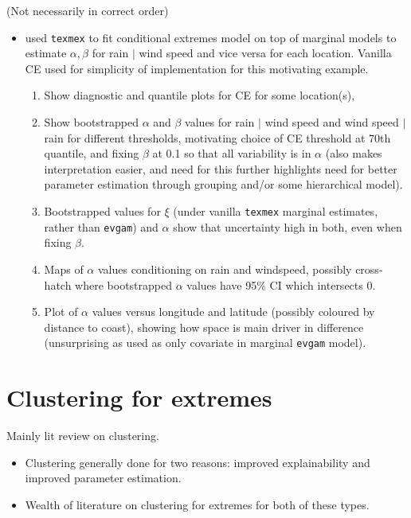\documentclass{article}
\numberwithin{equation}{section}
\begin{document}
(Not necessarily in correct order)
\begin{itemize}
  \item used \texttt{texmex} to fit conditional extremes model on top of marginal models to estimate $\alpha, \beta$ for rain $\mid$ wind speed and vice versa for each location. 
        Vanilla CE used for simplicity of implementation for this motivating example. 
   \begin{enumerate}
     \item Show diagnostic and quantile plots for CE for some location(s),
     \item Show bootstrapped $\alpha$ and $\beta$ values for rain $\mid$ wind speed and wind speed $\mid$ rain for different thresholds, motivating choice of CE threshold at 70th quantile, and fixing $\beta$ at 0.1 so that all variability is in $\alpha$ (also makes interpretation easier, and need for this further highlights need for better parameter estimation through grouping and/or some hierarchical model). 
     \item Bootstrapped values for $\xi$ (under vanilla \texttt{texmex} marginal estimates, rather than \texttt{evgam}) and $\alpha$ show that uncertainty high in both, even when fixing $\beta$. 
     \item Maps of $\alpha$ values conditioning on rain and windspeed, possibly cross-hatch where bootstrapped $\alpha$ values have 95\% CI which intersects 0. 
     \item Plot of $\alpha$ values versus longitude and latitude (possibly coloured by distance to coast), showing how space is main driver in difference (unsurprising as used as only covariate in marginal \texttt{evgam} model). 
   \end{enumerate}
\end{itemize}


\section{Clustering for extremes}\label{sec:clustering}

Mainly lit review on clustering. 
\begin{itemize}
  \item Clustering generally done for two reasons: improved explainability and improved parameter estimation. 
  \item Wealth of literature on clustering for extremes for both of these types. 
\end{itemize}
\end{document}
